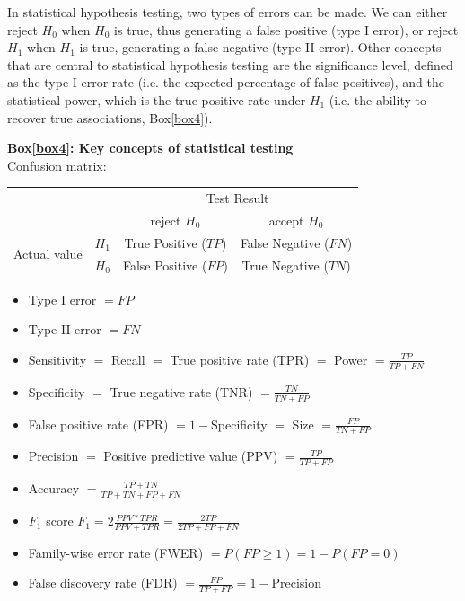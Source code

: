 In statistical hypothesis testing, two types of errors can be made. 
We can either reject $H_0$ when $H_0$ is true, thus generating a false positive (type I error), or reject $H_1$ when $H_1$ is true, generating a false negative (type II error).
Other concepts that are central to statistical hypothesis testing are the significance level, defined as the type I error rate (i.e. the expected percentage of false positives), and the statistical power, which is the true positive rate under $H_1$ (i.e. the ability to recover true associations, Box\ref{box4}).


\newpage

\begin{Comment}
\hspace{-2.5mm}\textbf{Box\ref{box4}: Key concepts of statistical testing}\label{box4}\\
Confusion matrix:

\begin{center}
\begin{tabular}{l|l|c|c|}
\multicolumn{2}{c}{}&\multicolumn{2}{c}{Test Result}\\
\cline{3-4}
\multicolumn{2}{c|}{}&reject $H_0$&accept $H_0$\\
\cline{2-4}
\multirow{2}{*}{Actual value}& $H_1$ & True Positive ($TP$) & False Negative ($FN$)\\
\cline{2-4}
& $H_0$ & False Positive ($FP$) & True Negative ($TN$)\\
\cline{2-4}
\end{tabular}
\end{center}

\begin{itemize}
    \item Type I error $= FP$
    \item Type II error $= FN$
    \item Sensitivity $=$ Recall $=$ True positive rate (TPR) $=$ Power $=\frac{TP}{TP+FN}$
    \item Specificity $=$ True negative rate (TNR) $=\frac{TN}{TN+FP}$
    \item False positive rate (FPR) $= 1-$Specificity $=$ Size $=\frac{FP}{TN+FP}$
    \item Precision $=$ Positive predictive value (PPV) $=\frac{TP}{TP+FP}$
    \item Accuracy $=\frac{TP+TN}{TP+TN+FP+FN}$
    \item $F_1$ score $F_1=2 \frac{PPV*TPR}{PPV+TPR}=\frac{2TP}{2TP+FP+FN}$
    \item Family-wise error rate (FWER) $=P(FP \geq 1)= 1 - P(FP=0)$
    \item False discovery rate (FDR) $=\frac{FP}{TP+FP}= 1- $Precision
\end{itemize}

\vfill

\end{Comment}

